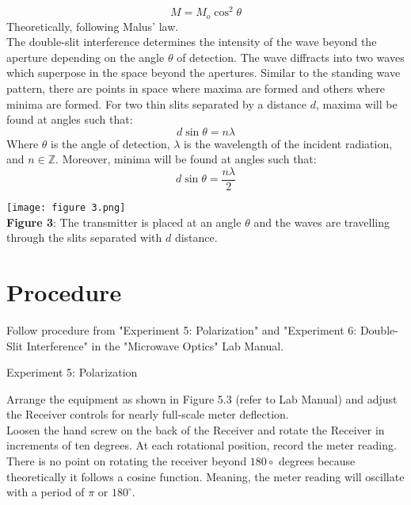 \documentclass[11pt]{article}
\def\Z{{\mathbb{Z}}}
\begin{document}
\begin{equation}
    M=M_o\cos^2\theta
\end{equation}
Theoretically, following Malus' law.\\
The double-slit interference determines the intensity of the wave beyond the aperture depending on the angle $\theta$ of detection. The wave diffracts into two waves which superpose in the space beyond the apertures. Similar to the standing wave pattern, there are points in space where maxima are formed and others where minima are formed. For two thin slits separated by a distance $d$, maxima will be found at angles such that: 
\begin{equation}
    d\sin\theta=n\lambda
\end{equation}
Where $\theta$ is the angle of detection, $\lambda$ is the wavelength of the incident radiation, and $n \in \Z$. Moreover, minima will be found at angles such that: 
\begin{equation}
    d\sin\theta=\frac{n\lambda}{2}
\end{equation}
\begin{center}
    \texttt{[image: figure 3.png]}\\\textbf{Figure 3}: The transmitter is placed at an angle $\theta$ and the waves are travelling through the slits separated with $d$ distance.
\end{center}

\section*{Procedure}
Follow procedure from "Experiment 5: Polarization" and "Experiment 6: Double-Slit Interference" in the "Microwave Optics" Lab Manual.

\begin{center}
    Experiment 5: Polarization
\end{center}
Arrange the equipment as shown in Figure 5.3 (refer to Lab Manual) and adjust the Receiver controls for nearly full-scale meter deflection.\\

\noindent Loosen the hand screw on the back of the Receiver and rotate the Receiver in increments of ten degrees. At each rotational position, record the meter reading.\\

\noindent There is no point on rotating the receiver beyond $180\circ$ degrees because theoretically it follows a cosine function. Meaning, the meter reading will oscillate with a period of $\pi$ or $180^\circ$.\\
\end{document}

